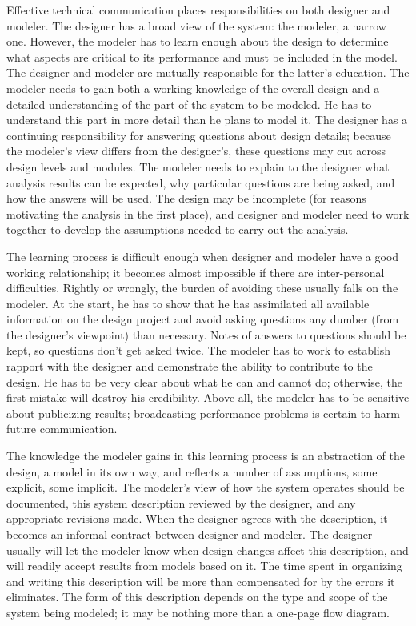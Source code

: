 Effective technical communication places responsibilities on both designer and
modeler. The designer has a broad view of the system: the modeler, a narrow
one. However, the modeler has to learn enough about the design to determine
what aspects are critical to its performance and must be included in the
model. The designer and modeler are mutually responsible for the latter's
education. The modeler needs to gain both a working knowledge of the overall
design and a detailed understanding of the part of the system to be modeled.
He has to understand this part in more detail than he plans to model it. The
designer has a continuing responsibility for answering questions about design
details; because the modeler's view differs from the designer's, these
questions may cut across design levels and modules. The modeler needs to
explain to the designer what analysis results can be expected, why particular
questions are being asked, and how the answers will be used. The design may
be incomplete (for reasons motivating the analysis in the first place), and
designer and modeler need to work together to develop the assumptions needed
to carry out the analysis.

The learning process is difficult enough when designer and modeler have a
good working relationship; it becomes almost impossible if there are
inter-personal difficulties. Rightly or wrongly, the burden of avoiding these
usually falls on the modeler. At the start, he has to show that he has
assimilated all available information on the design project and avoid asking
questions any dumber (from the designer's viewpoint) than necessary. Notes of
answers to questions should be kept, so questions don't get asked twice. The
modeler has to work to establish rapport with the designer and demonstrate
the ability to contribute to the design. He has to be very clear about what he
can and cannot do; otherwise, the first mistake will destroy his credibility.
Above all, the modeler has to be sensitive about publicizing results;
broadcasting performance problems is certain to harm future communication.

The knowledge the modeler gains in this learning process is an abstraction of
 the design, a model in its own way, and reflects a number of assumptions,
some explicit, some implicit. The modeler's view of how the system operates
should be documented, this system description reviewed by the designer, and
any appropriate revisions made. When the designer agrees with the
description, it becomes an informal contract between designer and modeler.
The designer usually will let the modeler know when design changes affect this
description, and will readily accept results from models based on it. The time
spent in organizing and writing this description will be more than compensated
for by the errors it eliminates. The form of this description depends on the
type and scope of the system being modeled; it may be nothing more than a
one-page flow diagram.

